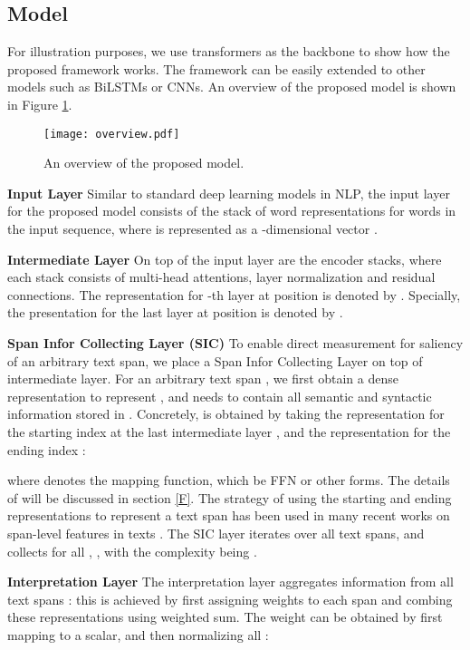 \documentclass[11pt,a4paper]{article}
\begin{document}
\subsection{Model}
For illustration purposes, we use transformers \cite{vaswani2017attention} as the backbone to show how the proposed framework works. The framework can be easily extended to other models such as BiLSTMs or CNNs. An overview of the proposed model is shown in Figure \ref{fig:overview}.

\begin{figure}
    \centering
    \texttt{[image: overview.pdf]}
    \caption{An overview of the proposed model.}
    \label{fig:overview}
\end{figure}

{\bf Input Layer} Similar to standard deep learning models in NLP, the input layer for the proposed model consists of the stack of word representations for words in the input sequence, where  is represented as a -dimensional vector . 

{\bf Intermediate Layer}
On top of the input layer are the  encoder stacks, where each stack consists of multi-head attentions, layer normalization and residual connections. 
The representation for -th layer at position  is denoted by . 
Specially, the presentation for the last layer at position  is denoted by . 

{\bf Span Infor Collecting Layer (SIC)}
To enable direct measurement for saliency of an arbitrary text span, we place a Span Infor Collecting Layer on top of intermediate layer. 
For an arbitrary text span , we first obtain a dense representation  to represent , and  needs to contain all
semantic and syntactic 
 information stored in . 
Concretely,  is obtained by taking the representation for the starting index at the last intermediate layer , and the representation for the ending index :
 
where  denotes the mapping function, which be FFN or other forms.
The details of  will be discussed in section \ref{F}. The strategy of using the starting and ending representations to represent a text span has been used in many recent works on  span-level features in texts \cite{li2019unified,joshi2020spanbert,wu2019coreference}.
The SIC layer iterates over all text spans, and collects  for all , , with the complexity being . 


{\bf Interpretation Layer} The interpretation layer aggregates information from all text spans :
this is achieved by first 
 assigning weights  to each span  and combing these representations using weighted sum. The weight  
 can be obtained by first mapping  to a scalar, and then normalizing all : 
\end{document}
